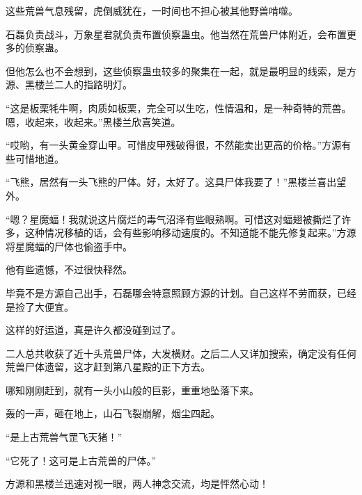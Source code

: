 \begin{this_body}
这些荒兽气息残留，虎倒威犹在，一时间也不担心被其他野兽啃噬。

石磊负责战斗，万象星君就负责布置侦察蛊虫。他当然在荒兽尸体附近，会布置更多的侦察蛊。

但他怎么也不会想到，这些侦察蛊虫较多的聚集在一起，就是最明显的线索，是方源、黑楼兰二人的指路明灯。

“这是板栗牦牛啊，肉质如板栗，完全可以生吃，性情温和，是一种奇特的荒兽。嗯，收起来，收起来。”黑楼兰欣喜笑道。

“哎哟，有一头黄金穿山甲。可惜皮甲残破得很，不然能卖出更高的价格。”方源有些可惜地道。

“飞熊，居然有一头飞熊的尸体。好，太好了。这具尸体我要了！”黑楼兰喜出望外。

“嗯？星魔蝠！我就说这片腐烂的毒气沼泽有些眼熟啊。可惜这对蝠翅被撕烂了许多，这种情况移植的话，会有些影响移动速度的。不知道能不能先修复起来。”方源将星魔蝠的尸体也偷盗手中。

他有些遗憾，不过很快释然。

毕竟不是方源自己出手，石磊哪会特意照顾方源的计划。自己这样不劳而获，已经是捡了大便宜。

这样的好运道，真是许久都没碰到过了。

二人总共收获了近十头荒兽尸体，大发横财。之后二人又详加搜索，确定没有任何荒兽尸体遗留，这才赶到第八星殿的正下方去。

哪知刚刚赶到，就有一头小山般的巨影，重重地坠落下来。

轰的一声，砸在地上，山石飞裂崩解，烟尘四起。

“是上古荒兽气罡飞天猪！”

“它死了！这可是上古荒兽的尸体。”

方源和黑楼兰迅速对视一眼，两人神念交流，均是怦然心动！

\end{this_body}

